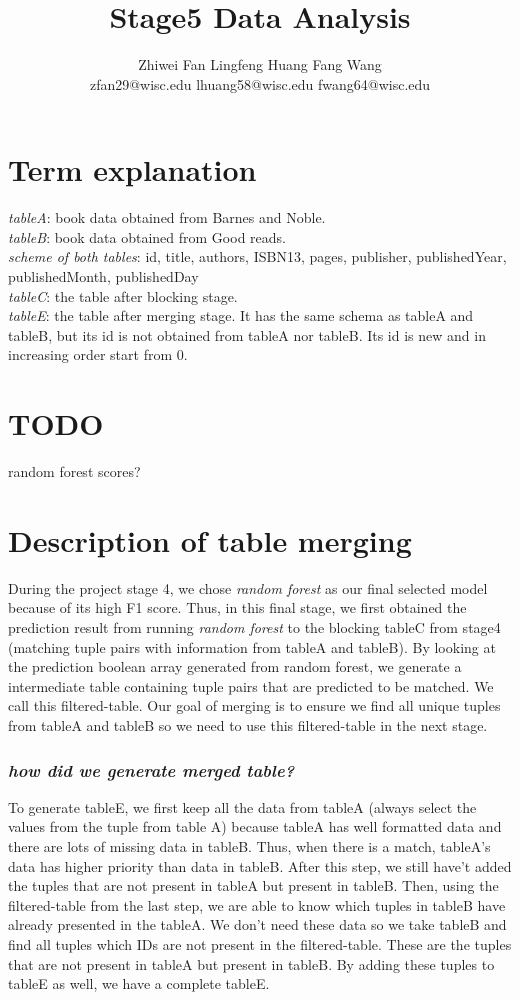\documentclass[10pt, oneside]{article}
\title{\textbf{Stage5 Data Analysis}}
\author{Zhiwei Fan\hspace{7ex}
	   Lingfeng Huang\hspace{7ex}
	   Fang Wang\\
	   zfan29@wisc.edu\hspace{3ex}
	   lhuang58@wisc.edu\hspace{3ex}
	   fwang64@wisc.edu
	   }
\begin{document}
\maketitle 

\section*{Term explanation}
\textit{tableA}: book data obtained from Barnes and Noble. \\ 
\textit{tableB}: book data obtained from Good reads. \\ 
\textit{scheme of both tables}: id, title,	authors, ISBN13,	pages,	publisher,	publishedYear,  publishedMonth, publishedDay\\
\textit{tableC}: the table after blocking stage.\\ 
\textit{tableE}: the table after merging stage. It has the same schema as tableA and tableB, but its id is not obtained from tableA nor tableB. Its id is new and in increasing order start from 0.\\ 
\section*{TODO}
random forest scores?
\section*{Description of table merging}
During the project stage 4, we chose \textit{random forest} as our final selected model because of its high F1 score.  
Thus, in this final stage, we first obtained the prediction result from running \textit{random forest} to the blocking tableC from stage4 (matching tuple pairs with information from tableA and tableB). By looking at the prediction boolean array generated from random forest, we generate a intermediate table containing tuple pairs that are predicted to be matched. We call this filtered-table. Our goal of merging is to ensure we find all unique tuples from tableA and tableB so we need to use this filtered-table in the next stage.

\subsubsection*{\textit{how did we generate merged table?}}
To generate tableE, we first keep all the data from tableA (always select the values from the tuple from table A) because tableA has well formatted data and there are lots of missing data in tableB. Thus, when there is a match, tableA's data has higher priority than data in tableB. After this step, we still have't added the tuples that are not present in tableA but present in tableB. Then, using the filtered-table from the last step, we are able to know which tuples in tableB have already presented in the tableA. We don't need these data so we take tableB and find all tuples which IDs are not  present in the filtered-table. These are the tuples that are not present in tableA but present in tableB. By adding these tuples to tableE as well, we have a complete tableE.
\end{document}

